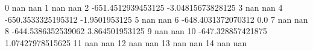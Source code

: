 0 nan nan
1 nan nan
2 -651.4512939453125 -3.04815673828125
3 nan nan
4 -650.3533325195312 -1.9501953125
5 nan nan
6 -648.4031372070312 0.0
7 nan nan
8 -644.5386352539062 3.864501953125
9 nan nan
10 -647.328857421875 1.07427978515625
11 nan nan
12 nan nan
13 nan nan
14 nan nan
